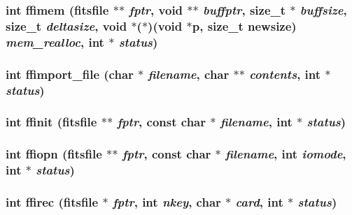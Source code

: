 \subsubsection{\setlength{\rightskip}{0pt plus 5cm}int ffimem (\bf{fitsfile} $\ast$$\ast$ {\em fptr}, void $\ast$$\ast$ {\em buffptr}, size\_\-t $\ast$ {\em buffsize}, size\_\-t {\em deltasize}, void $\ast$($\ast$)(void $\ast$p, size\_\-t newsize) {\em mem\_\-realloc}, int $\ast$ {\em status})}\label{fitsio_8h_ad075adabaf2dc2bcd43717eaed768fa}


\subsubsection{\setlength{\rightskip}{0pt plus 5cm}int ffimport\_\-file (char $\ast$ {\em filename}, char $\ast$$\ast$ {\em contents}, int $\ast$ {\em status})}\label{fitsio_8h_39fd7b9ba945cd1b97c979d71dd85184}


\subsubsection{\setlength{\rightskip}{0pt plus 5cm}int ffinit (\bf{fitsfile} $\ast$$\ast$ {\em fptr}, const char $\ast$ {\em filename}, int $\ast$ {\em status})}\label{fitsio_8h_7bcc7eb7ff6f0bf2ab7f40cc161b6dc0}


\subsubsection{\setlength{\rightskip}{0pt plus 5cm}int ffiopn (\bf{fitsfile} $\ast$$\ast$ {\em fptr}, const char $\ast$ {\em filename}, int {\em iomode}, int $\ast$ {\em status})}\label{fitsio_8h_825f4f914579c653cdaf72db6073e325}


\subsubsection{\setlength{\rightskip}{0pt plus 5cm}int ffirec (\bf{fitsfile} $\ast$ {\em fptr}, int {\em nkey}, char $\ast$ {\em card}, int $\ast$ {\em status})}\label{fitsio_8h_edb502cbbb6efbbaf1eecbfbd97b64ef}


